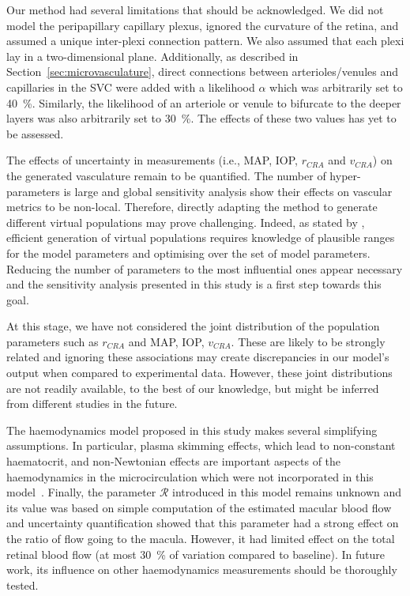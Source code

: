 \documentclass[11pt,]{article}
\begin{document}
Our method had several limitations that should be acknowledged.
We did not model the peripapillary capillary plexus, ignored the curvature of the retina, and assumed a unique inter-plexi connection pattern.
We also assumed that each plexi lay in a two-dimensional plane.
Additionally, as described in Section~\ref{sec:microvasculature}, direct connections between arterioles/venules and capillaries in the SVC were added with a likelihood $\alpha$ which was arbitrarily set to \SI{40}{\percent}.
Similarly, the likelihood of an arteriole or venule to bifurcate to the deeper layers was also arbitrarily set to \SI{30}{\percent}.
The effects of these two values has yet to be assessed.

The effects of uncertainty in measurements (i.e., MAP, IOP, $r_{CRA}$ and $v_{CRA}$) on the generated vasculature remain to be quantified.
The number of hyper-parameters is large and global sensitivity analysis show their effects on vascular metrics to be non-local.
Therefore, directly adapting the method to generate different virtual populations may prove challenging.
Indeed, as stated by \citet{Allen_2016}, efficient generation of virtual populations requires knowledge of plausible ranges for the model parameters and optimising over the set of model parameters.
Reducing the number of parameters to the most influential ones appear necessary and the sensitivity analysis presented in this study is a first step towards this goal.

At this stage, we have not considered the joint distribution of the population parameters such as $r_{CRA}$ and MAP, IOP, $v_{CRA}$.
These are likely to be strongly related and ignoring these associations may create discrepancies in our model's output when compared to experimental data.
However, these joint distributions are not readily available, to the best of our knowledge, but might be inferred from different studies in the future.

The haemodynamics model proposed in this study makes several simplifying assumptions.
In particular, plasma skimming effects, which lead to non-constant haematocrit, and non-Newtonian effects are important aspects of the haemodynamics in the microcirculation which were not incorporated in this model~\cite{Faahraeus1931,Secomb2013}.
Finally, the parameter $\mathcal R$ introduced in this model remains unknown and its value was based on simple computation of the estimated macular blood flow and uncertainty quantification showed that this parameter had a strong effect on the ratio of flow going to the macula.
However, it had limited effect on the total retinal blood flow (at most \SI{30}{\percent} of variation compared to baseline).
In future work, its influence on other haemodynamics measurements should be thoroughly tested.
\end{document}
